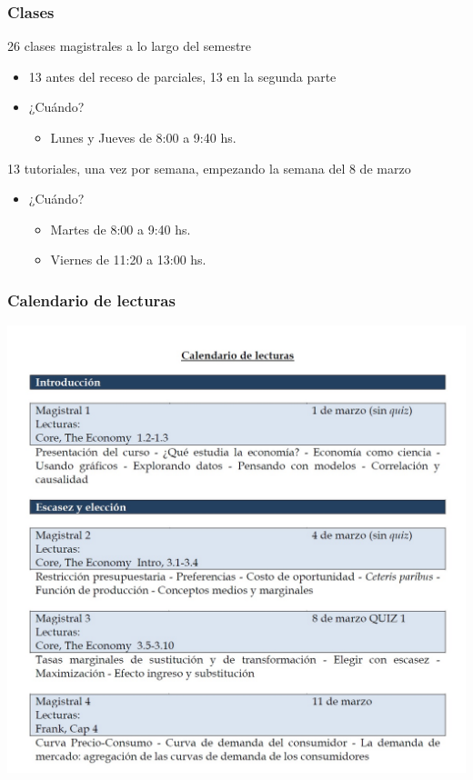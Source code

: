 \documentclass[14pt]{beamer}
\begin{document}
\begin{frame}
\frametitle{Clases}
26 clases magistrales a lo largo del semestre 
\begin{itemize}
        \item 13 antes del receso de parciales, 13 en la segunda parte
        \item ¿Cuándo?
            \begin{itemize}
            \item Lunes y Jueves de 8:00 a 9:40 hs.
            \end{itemize}
\end{itemize}
13 tutoriales, una vez por semana, empezando la semana del 8 de marzo
\begin{itemize}
 \item ¿Cuándo?
        \begin{itemize}
            \item Martes de 8:00 a 9:40 hs.
            \item Viernes de 11:20 a 13:00 hs.
        \end{itemize}
\end{itemize}
\end{frame}

\begin{frame}
\frametitle{Calendario de lecturas}
\centering
\includegraphics[scale=0.25]{Figures/calendario.jpg}
\end{frame}
\end{document}
